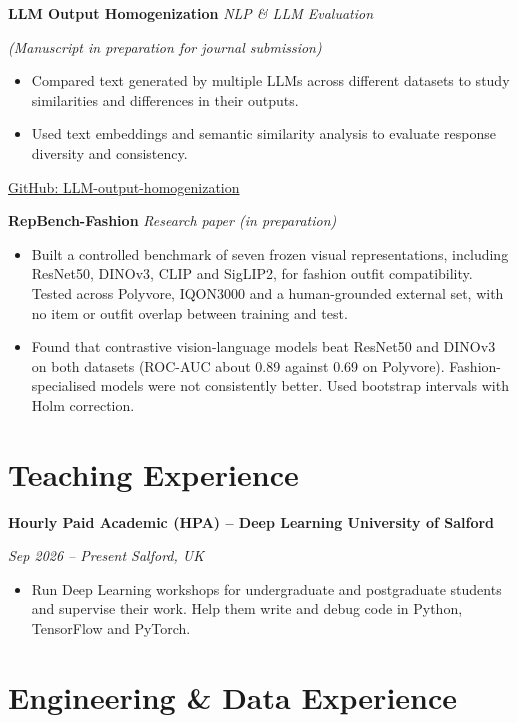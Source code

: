 \documentclass[10pt,a4paper]{article}
\let\cvOriginalTextbf\textbf
\renewcommand{\textbf}[1]{{\fontsize{10.5pt}{14pt}\selectfont\cvOriginalTextbf{#1}}}
\providecommand{\tightlist}{\setlength{\itemsep}{3pt}\setlength{\parskip}{0pt}}
\begin{document}
\textbf{LLM Output Homogenization} \emph{\textbar{} NLP \& LLM
Evaluation}

\emph{(Manuscript in preparation for journal submission)}

\begin{itemize}
\item
  Compared text generated by multiple LLMs across different datasets to
  study similarities and differences in their outputs.
\item
  Used text embeddings and semantic similarity analysis to evaluate
  response diversity and consistency.
\end{itemize}

\href{https://github.com/alifarzadjamali/LLM-output-homogenization}{GitHub:
LLM-output-homogenization}

\textbf{RepBench-Fashion} \emph{\textbar{} Research paper (in
preparation)}

\begin{itemize}
\item
  Built a controlled benchmark of seven frozen visual representations,
  including ResNet50, DINOv3, CLIP and SigLIP2, for fashion outfit
  compatibility. Tested across Polyvore, IQON3000 and a human-grounded
  external set, with no item or outfit overlap between training and
  test.
\item
  Found that contrastive vision-language models beat ResNet50 and DINOv3
  on both datasets (ROC-AUC about 0.89 against 0.69 on Polyvore).
  Fashion-specialised models were not consistently better. Used
  bootstrap intervals with Holm correction.
\end{itemize}

\section{Teaching Experience}\label{teaching-experience}

\textbf{Hourly Paid Academic (HPA) -- Deep Learning \textbar{}
University of Salford}

\emph{Sep 2026 -- Present \textbar{} Salford, UK}

\begin{itemize}
\tightlist
\item
  Run Deep Learning workshops for undergraduate and postgraduate
  students and supervise their work. Help them write and debug code in
  Python, TensorFlow and PyTorch.
\end{itemize}

\section{Engineering \& Data
Experience}\label{engineering-data-experience}
\end{document}
